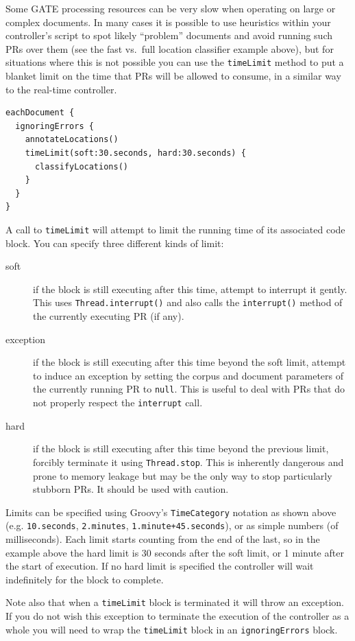 Some GATE processing resources can be very slow when operating on large or
complex documents.  In many cases it is possible to use heuristics within your
controller's script to spot likely ``problem'' documents and avoid running such
PRs over them (see the fast vs.\ full location classifier example above), but
for situations where this is not possible you can use the {\tt timeLimit}
method to put a blanket limit on the time that PRs will be allowed to consume,
in a similar way to the real-time controller.
\begin{lstlisting}
eachDocument {
  ignoringErrors {
    annotateLocations()
    timeLimit(soft:30.seconds, hard:30.seconds) {
      classifyLocations()
    }
  }
}
\end{lstlisting}
%
A call to {\tt timeLimit} will attempt to limit the running time of its
associated code block.  You can specify three different kinds of limit:
\begin{description}
\item[soft] if the block is still executing after this time, attempt to
  interrupt it gently.  This uses {\tt Thread.interrupt()} and also calls the
  {\tt interrupt()} method of the currently executing PR (if any).
\item[exception] if the block is still executing after this time beyond the
  soft limit, attempt to induce an exception by setting the corpus and document
  parameters of the currently running PR to {\tt null}.  This is useful to deal
  with PRs that do not properly respect the {\tt interrupt} call.
\item[hard] if the block is still executing after this time beyond the previous
  limit, forcibly terminate it using {\tt Thread.stop}.  This is inherently
  dangerous and prone to memory leakage but may be the only way to stop
  particularly stubborn PRs.  It should be used with caution.
\end{description}
%
Limits can be specified using Groovy's {\tt TimeCategory} notation as shown
above (e.g. {\tt 10.seconds}, {\tt 2.minutes}, {\tt 1.minute+45.seconds}), or
as simple numbers (of milliseconds).  Each limit starts counting from the end
of the last, so in the example above the hard limit is 30 seconds after the
soft limit, or 1 minute after the start of execution.  If no hard limit is
specified the controller will wait indefinitely for the block to complete.

Note also that when a {\tt timeLimit} block is terminated it will throw an
exception.  If you do not wish this exception to terminate the execution of the
controller as a whole you will need to wrap the {\tt timeLimit} block in an
{\tt ignoringErrors} block.

